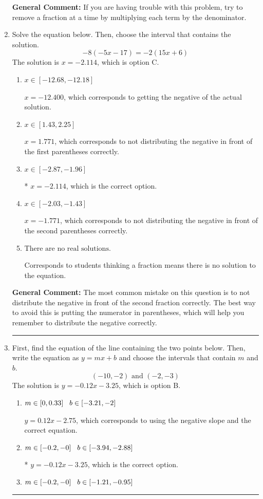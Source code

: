 \documentclass{extbook}[14pt]
\newcommand{\litem}[1]{\item #1

\rule{\textwidth}{0.4pt}}
\begin{document}
\begin{enumerate}
{\textbf{General Comment:} If you are having trouble with this problem, try to remove a fraction at a time by multiplying each term by the denominator.
}
\litem{
Solve the equation below. Then, choose the interval that contains the solution.
\[ -8(-5x -17) = -2(15x + 6) \]The solution is \( x = -2.114 \), which is option C.\begin{enumerate}[label=\Alph*.]
\item \( x \in [-12.68, -12.18] \)

$x = -12.400$, which corresponds to getting the negative of the actual solution.
\item \( x \in [1.43, 2.25] \)

$x = 1.771$, which corresponds to not distributing the negative in front of the first parentheses correctly.
\item \( x \in [-2.87, -1.96] \)

* $x = -2.114$, which is the correct option.
\item \( x \in [-2.03, -1.43] \)

$x = -1.771$, which corresponds to not distributing the negative in front of the second parentheses correctly.
\item \( \text{There are no real solutions.} \)

Corresponds to students thinking a fraction means there is no solution to the equation.
\end{enumerate}

\textbf{General Comment:} The most common mistake on this question is to not distribute the negative in front of the second fraction correctly. The best way to avoid this is putting the numerator in parentheses, which will help you remember to distribute the negative correctly.
}
\litem{
First, find the equation of the line containing the two points below. Then, write the equation as $ y=mx+b $ and choose the intervals that contain $m$ and $b$.
\[ (-10, -2) \text{ and } (-2, -3) \]The solution is \( y = -0.12x -3.25 \), which is option B.\begin{enumerate}[label=\Alph*.]
\item \( m \in [0, 0.33] \hspace*{3mm} b \in [-3.21, -2] \)

 $y = 0.12x -2.75$, which corresponds to using the negative slope and the correct equation.
\item \( m \in [-0.2, -0] \hspace*{3mm} b \in [-3.94, -2.88] \)

* $y = -0.12x -3.25$, which is the correct option.
\item \( m \in [-0.2, -0] \hspace*{3mm} b \in [-1.21, -0.95] \)


\end{enumerate}}
\end{enumerate}
\end{document}
